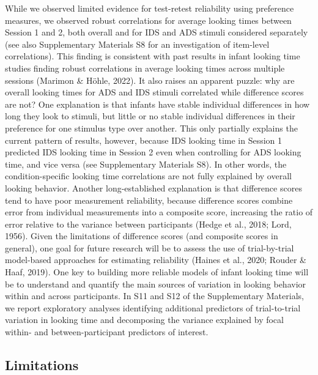 \documentclass[
  man,floatsintext]{apa6}
\begin{document}
While we observed limited evidence for test-retest reliability using preference measures, we observed robust correlations for average looking times between Session 1 and 2, both overall and for IDS and ADS stimuli considered separately (see also Supplementary Materials S8 for an investigation of item-level correlations).
This finding is consistent with past results in infant looking time studies finding robust correlations in average looking times across multiple sessions (Marimon \& Höhle, 2022).
It also raises an apparent puzzle: why are overall looking times for ADS and IDS stimuli correlated while difference scores are not?
One explanation is that infants have stable individual differences in how long they look to stimuli, but little or no stable individual differences in their preference for one stimulus type over another.
This only partially explains the current pattern of results, however, because IDS looking time in Session 1 predicted IDS looking time in Session 2 even when controlling for ADS looking time, and vice versa (see Supplementary Materials S8).
In other words, the condition-specific looking time correlations are not fully explained by overall looking behavior.
Another long-established explanation is that difference scores tend to have poor measurement reliability, because difference scores combine error from individual measurements into a composite score, increasing the ratio of error relative to the variance between participants (Hedge et al., 2018; Lord, 1956).
Given the limitations of difference scores (and composite scores in general), one goal for future research will be to assess the use of trial-by-trial model-based approaches for estimating reliability (Haines et al., 2020; Rouder \& Haaf, 2019).
One key to building more reliable models of infant looking time will be to understand and quantify the main sources of variation in looking behavior within and across participants.
In S11 and S12 of the Supplementary Materials, we report exploratory analyses identifying additional predictors of trial-to-trial variation in looking time and decomposing the variance explained by focal within- and between-participant predictors of interest.

\hypertarget{limitations}{%
\subsection{Limitations}\label{limitations}}
\end{document}
